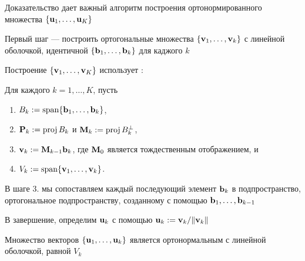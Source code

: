 \begin{frame}
    
    \vspace{2em}
    Доказательство дает важный алгоритм построения ортонормированного множества $\{{\mathbf u}_1, \ldots, {\mathbf u}_K\}$
    
    \vspace{1em}
    Первый шаг --- построить ортогональные множества 
    $\{{\mathbf v}_1, \ldots, {\mathbf v}_k\}$ с линейной оболочкой, идентичной
    $\{{\mathbf b}_1, \ldots, {\mathbf b}_k\}$ для каджого $k$
    
    Построение
    $\{{\mathbf v}_1, \ldots, {\mathbf v}_K\}$ использует 
    :
    
    Для каждого $k = 1, \ldots, K$, пусть 
    \begin{enumerate}
        \item $B_k := \operatorname{span}\{{\mathbf b}_1, \ldots, {\mathbf b}_k\}$,
        \item $\mathbf P_k := \operatorname{proj} B_k$ и $\mathbf M_k := \operatorname{proj} B_k^{\perp}$,
        \item ${\mathbf v}_k := \mathbf M_{k-1} {\mathbf b}_k$, где $\mathbf M_0$ является
            тождественным отображением, и
        \item $V_k := \operatorname{span}\{{\mathbf v}_1, \ldots, {\mathbf v}_k\}$.
    \end{enumerate}
    
\end{frame}

\begin{frame}

    \vspace{2em}
    В шаге 3. мы сопоставляем каждый последующий элемент ${\mathbf b}_k$ в подпространство, 
    ортогональное подпространству, созданному с помощью ${\mathbf b}_1, \ldots, {\mathbf b}_{k-1}$
    
    \vspace{.7em}
    В завершение, определим ${\mathbf u}_k$ с помощью ${\mathbf u}_k :=
    {\mathbf v}_k / \| {\mathbf v}_k \|$ 
    
    Множество векторов 
    $\{{\mathbf u}_1, \ldots, {\mathbf u}_k\}$ является ортонормальным с линейной оболочкой,
    равной $V_k$
    
\end{frame}



